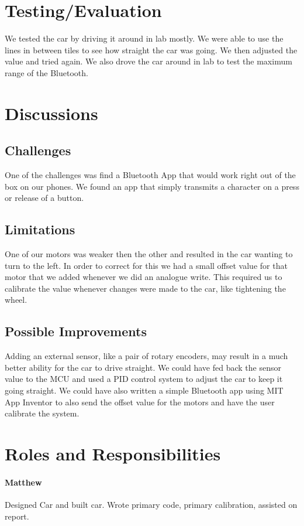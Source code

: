 \documentclass{article}
\begin{document}
	\section*{Testing/Evaluation}
	\par 
	We tested the car by driving it around in lab mostly. We were able to use the lines in between tiles to see how straight the car was going. We then adjusted the value and tried again. We also drove the car around in lab to test the maximum range of the Bluetooth.
	\section*{Discussions}
	\subsection*{Challenges}
	One of the challenges was find a Bluetooth App that would work right out of the box on our phones. We found an app that simply transmits a character on a press or release of a button.
	\subsection*{Limitations}
	One of our motors was weaker then the other and resulted in the car wanting to turn to the left. In order to correct for this we had a small offset value for that motor that we added whenever we did an analogue write. This required us to calibrate the value whenever changes were made to the car, like tightening the wheel.
	\subsection*{Possible Improvements}
	Adding an external sensor, like a pair of rotary encoders, may result in a much better ability for the car to drive straight. We could have fed back the sensor value to the MCU and used a PID control system to adjust the car to keep it going straight. We could have also written a simple Bluetooth app using MIT App Inventor to also send the offset value for the motors and have the user calibrate the system.
	\section*{Roles and Responsibilities}
	\paragraph{Matthew} Designed Car and built car. Wrote primary code, primary calibration, assisted on report.
\end{document}

